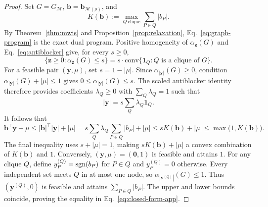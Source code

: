 \documentclass[10pt,aps,pra,twocolumn,floatfix,nofootinbib,superscriptaddress,longbibliography]{revtex4-2}
\newcommand{\Mcal}{\mathcal M}
\newcommand{\conv}{\mathrm{conv}}
\providecommand{\mathbm}[1]{\bm{#1}}
\begin{document}
\begin{bibunit}[apsrev4-2]
		\begin{proof}
			Set $G=G_\Mcal$, $\mathbm{b}=\mathbm{b}_{\Mcal(\rho)}$, and
			\begin{equation}
				K(\mathbm{b}):=\max_{Q\ \mathrm{clique}}\sum_{P\in Q}|b_P|.
			\end{equation}
			By Theorem~\ref{thm:mwis} and Proposition~\ref{prop:relaxation}, Eq.~\eqref{eq:graph-program} is the exact dual program.
			Positive homogeneity of $\alpha_{\mathbm{z}}(G)$ and Eq.~\eqref{eq:antiblocker} give, for every $s\ge0$,
			\begin{equation}
				\{\mathbm{z}\ge0:\alpha_{\mathbm{z}}(G)\le s\}=s\cdot\conv\{\mathbm{1}_Q:Q\text{ is a clique of }G\}.
			\end{equation}
			For a feasible pair $(\mathbm{y},\mu)$, set $s=1-|\mu|$. Since $\alpha_{|\mathbm{y}|}(G)\ge0$, condition $\alpha_{|\mathbm{y}|}(G)+|\mu|\le1$ gives $0\le\alpha_{|\mathbm{y}|}(G)\le s$. The scaled antiblocker identity therefore provides coefficients $\lambda_Q\ge0$ with $\sum_Q\lambda_Q=1$ such that
			\begin{equation}
				|\mathbm{y}|=s\sum_Q\lambda_Q\mathbm{1}_Q.
			\end{equation}
			It follows that
			\begin{equation}
				\mathbm{b}^\top\mathbm{y}+\mu\le|\mathbm{b}|^\top|\mathbm{y}|+|\mu|=s\sum_Q\lambda_Q\sum_{P\in Q}|b_P|+|\mu|\le sK(\mathbm{b})+|\mu|\le\max\big(1,K(\mathbm{b})\big).
			\end{equation}
			The final inequality uses $s+|\mu|=1$, making $sK(\mathbm{b})+|\mu|$ a convex combination of $K(\mathbm{b})$ and $1$.
			Conversely, $(\mathbm{y},\mu)=(\mathbm{0},1)$ is feasible and attains $1$.
			For any clique $Q$, define $y_P^{(Q)}=\operatorname{sgn}(b_P)$ for $P\in Q$ and $y_P^{(Q)}=0$ otherwise.
			Every independent set meets $Q$ in at most one node, so $\alpha_{|\mathbm{y}^{(Q)}|}(G)\le1$.
			Thus $(\mathbm{y}^{(Q)},0)$ is feasible and attains $\sum_{P\in Q}|b_P|$.
			The upper and lower bounds coincide, proving the equality in Eq.~\eqref{eq:closed-form-app}.
			

\end{proof}
\end{bibunit}
\end{document}
